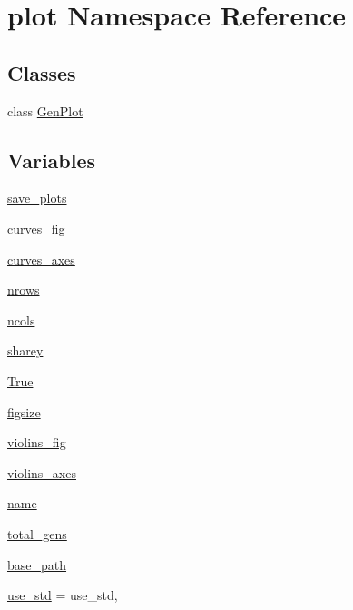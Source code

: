 \hypertarget{namespaceplot}{}\section{plot Namespace Reference}
\label{namespaceplot}
\subsection*{Classes}
\begin{DoxyCompactItemize}
\item 
class \hyperlink{classplot_1_1_gen_plot}{Gen\+Plot}
\end{DoxyCompactItemize}
\subsection*{Variables}
\begin{DoxyCompactItemize}
\item 
\hyperlink{namespaceplot_a055449dd2337555af9b0ae2b0c3afe06}{save\+\_\+plots}
\item 
\hyperlink{namespaceplot_a8dfc2d760679cfd479b38359034367c3}{curves\+\_\+fig}
\item 
\hyperlink{namespaceplot_a9425b2199251bbd1cd490e1e224d3839}{curves\+\_\+axes}
\item 
\hyperlink{namespaceplot_a4f0f4f4f7d0c8774981e17f281a733b8}{nrows}
\item 
\hyperlink{namespaceplot_ae9efee44b9e15b82912f864c95572dff}{ncols}
\item 
\hyperlink{namespaceplot_a95ad59ee127f8001f03af01ec0bd1242}{sharey}
\item 
\hyperlink{namespaceplot_a6d72802b3442c0fab73f4958144e3251}{True}
\item 
\hyperlink{namespaceplot_a8192100c5c002398c4eaba82a948dc38}{figsize}
\item 
\hyperlink{namespaceplot_aeaca2b1f1df037ca6c41bcfc361b2d86}{violins\+\_\+fig}
\item 
\hyperlink{namespaceplot_a2e68f3fc92fc5681977a38c28bd831d1}{violins\+\_\+axes}
\item 
\hyperlink{namespaceplot_a4a60c65527f7c2f3c25d79cc78431b73}{name}
\item 
\hyperlink{namespaceplot_aab32b36b38d8f2839229f5b97aa09227}{total\+\_\+gens}
\item 
\hyperlink{namespaceplot_aef22552e9733ecf1bb53580f4bff150f}{base\+\_\+path}
\item 
\hyperlink{namespaceplot_a540837c6df4283b87730e2a21178b7da}{use\+\_\+std} = use\+\_\+std,

\end{DoxyCompactItemize}
